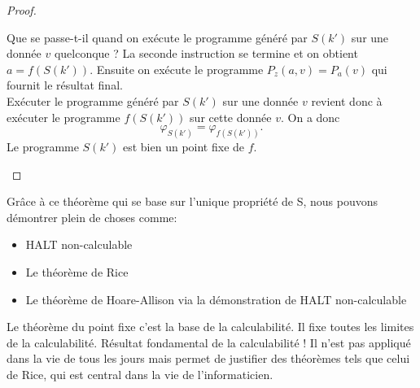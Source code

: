 \begin{proof}
\begin{myrem}
          Que se passe-t-il quand on exécute le programme généré par $S(k')$ sur une donnée $v$ quelconque ?
          La seconde instruction se termine et on obtient $a = f(S(k'))$.
          Ensuite on exécute le programme $P_z(a,v) = P_a(v)$ qui fournit le résultat final. \\
          Exécuter le programme généré par $S(k')$ sur une donnée $v$ revient donc à exécuter le programme $f(S(k'))$ sur cette donnée $v$.
          On a donc
          \[ \varphi_{S(k')} = \varphi_{f(S(k'))}. \]
          Le programme $S(k')$ est bien un point fixe de $f$.
		\end{myrem}
\end{proof}

\begin{myrem}

Grâce à ce théorème qui se base sur l'unique propriété de S, nous pouvons démontrer plein de choses comme:
\begin{itemize}
   \item HALT non-calculable
   \item Le théorème de Rice
   \item Le théorème de Hoare-Allison via la démonstration de HALT non-calculable
\end{itemize}
Le théorème du point fixe c'est la base de la calculabilité. Il fixe toutes les limites de la calculabilité. Résultat fondamental de la calculabilité ! Il n'est pas appliqué dans la vie de tous les jours mais permet de justifier des théorèmes tels que celui de Rice, qui est central dans la vie de l'informaticien.
 
\end{myrem}


